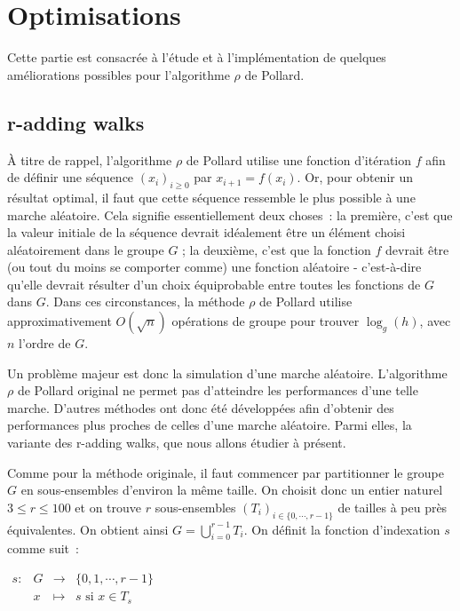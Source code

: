 \chapter{Optimisations}
	Cette partie est consacrée à l'étude et à l'implémentation de quelques améliorations possibles pour l'algorithme $\rho$ de Pollard.

		\section{r-adding walks}
    À titre de rappel, l'algorithme $\rho$ de Pollard utilise une fonction d'itération $f$ afin de définir une séquence $(x_i)_{i \ge 0}$ par $x_{i+1} = f(x_i)$. Or, pour obtenir un résultat optimal, il faut que cette séquence ressemble le plus possible à une marche aléatoire. Cela signifie essentiellement deux choses~: la première, c'est que la valeur initiale de la séquence devrait idéalement être un élément choisi aléatoirement dans le groupe $G$ ; la deuxième, c'est que la fonction $f$ devrait être (ou tout du moins se comporter comme) une fonction aléatoire - c'est-à-dire qu'elle devrait résulter d'un choix équiprobable entre toutes les fonctions de $G$ dans $G$. Dans ces circonstances, la méthode $\rho$ de Pollard utilise approximativement $O(\sqrt{n})$ opérations de groupe pour trouver $\log_g(h)$, avec $n$ l'ordre de $G$.

		Un problème majeur est donc la simulation d'une marche aléatoire. L'algorithme $\rho$ de Pollard original ne permet pas d'atteindre les performances d'une telle marche. D'autres méthodes ont donc été développées afin d'obtenir des performances plus proches de celles d'une marche aléatoire. Parmi elles, la variante des r-adding walks, que nous allons étudier à présent.

		Comme pour la méthode originale, il faut commencer par partitionner le groupe $G$ en sous-ensembles d'environ la même taille. On choisit donc un entier naturel $3 \leq r \leq 100$ et on trouve $r$ sous-ensembles $(T_i)_{i \in \{0,\cdots,r-1\}}$ de tailles à peu près équivalentes. On obtient ainsi $G = \bigcup\limits_{i=0}^{r-1} T_i$. On définit la fonction d'indexation $s$ comme suit~:

		\begin{center}

		$\begin{array}{lrcl}
		s : & G & \longrightarrow & \{0,1,\cdots,r-1\} \\
		    & x & \longmapsto & s \text{ si } x \in T_s
		\end{array}$

		\end{center}

